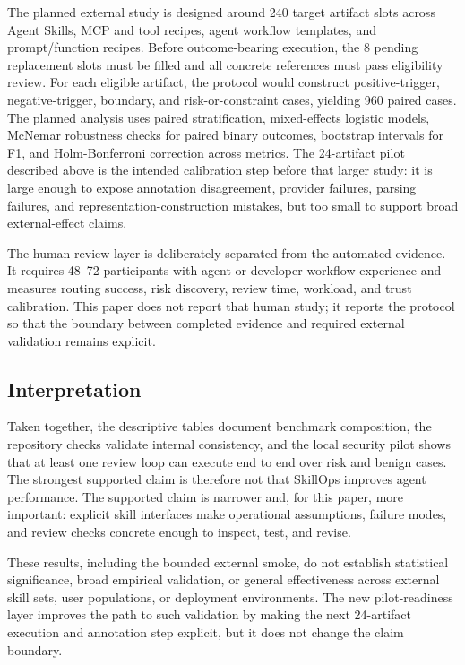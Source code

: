 \documentclass[11pt]{article}
\begin{document}
The planned external study is designed around 240 target artifact slots across
Agent Skills, MCP and tool recipes, agent workflow templates, and
prompt/function recipes. Before outcome-bearing execution, the 8 pending
replacement slots must be filled and all concrete references must pass
eligibility review. For each eligible artifact, the protocol would construct
positive-trigger, negative-trigger, boundary, and risk-or-constraint cases,
yielding 960 paired cases. The planned analysis uses
paired stratification, mixed-effects logistic models, McNemar robustness
checks for paired binary outcomes, bootstrap intervals for F1, and
Holm-Bonferroni correction across metrics. The 24-artifact pilot described
above is the intended calibration step before that larger study: it is large
enough to expose annotation disagreement, provider failures, parsing failures,
and representation-construction mistakes, but too small to support broad
external-effect claims.

The human-review layer is deliberately separated from the automated evidence.
It requires 48--72 participants with agent or developer-workflow experience
and measures routing success, risk discovery, review time, workload, and trust
calibration. This paper does not report that human study; it reports the
protocol so that the boundary between completed evidence and required external
validation remains explicit.

\subsection{Interpretation}

Taken together, the descriptive tables document benchmark composition, the
repository checks validate internal consistency, and the local security pilot
shows that at least one review loop can execute end to end over risk and benign
cases. The strongest supported claim is therefore not that SkillOps improves
agent performance. The supported claim is narrower and, for this paper, more
important: explicit skill interfaces make operational assumptions, failure
modes, and review checks concrete enough to inspect, test, and revise.

These results, including the bounded external smoke, do not establish
statistical significance, broad empirical validation, or general effectiveness
across external skill sets, user populations, or deployment environments.
The new pilot-readiness layer improves the path to such validation by making
the next 24-artifact execution and annotation step explicit, but it does not
change the claim boundary.
\end{document}
